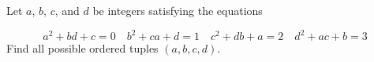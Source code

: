 Let $a$, $b$, $c$, and $d$ be integers satisfying the equations

$$a^2+bd+c=0\quad b^2+ca+d=1\quad c^2+db+a=2\quad d^2+ac+b=3$$Find all possible ordered tuples $(a,b,c,d)$.
